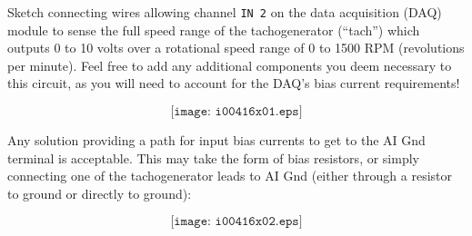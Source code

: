 

Sketch connecting wires allowing channel {\tt IN 2} on the data acquisition (DAQ) module to sense the full speed range of the tachogenerator (``tach'') which outputs 0 to 10 volts over a rotational speed range of 0 to 1500 RPM (revolutions per minute).  Feel free to add any additional components you deem necessary to this circuit, as you will need to account for the DAQ's bias current requirements!

\vskip 50pt

$$\texttt{[image: i00416x01.eps]}$$







Any solution providing a path for input bias currents to get to the AI Gnd terminal is acceptable.  This may take the form of bias resistors, or simply connecting one of the tachogenerator leads to AI Gnd (either through a resistor to ground or directly to ground):

$$\texttt{[image: i00416x02.eps]}$$










